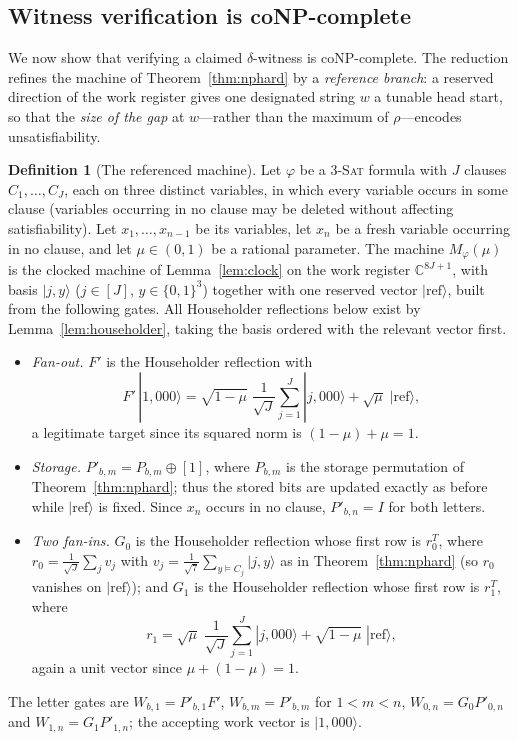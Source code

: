 \documentclass[11pt]{amsart}
\theoremstyle{definition}
\newtheorem{definition}[theorem]{Definition}
\theoremstyle{remark}
\newcommand{\C}{\mathbb{C}}
\begin{document}
\subsection*{Witness verification is coNP-complete}

We now show that verifying a claimed $\delta$-witness is
coNP-complete. The reduction refines the machine of
Theorem~\ref{thm:nphard} by a \emph{reference branch}: a reserved
direction of the work register gives one designated string $w$ a
tunable head start, so that the \emph{size of the gap} at
$w$---rather than the maximum of $\rho$---encodes unsatisfiability.

\begin{definition}[The referenced machine]\label{def:refmachine}
Let $\varphi$ be a \textup{\textsc{3-Sat}} formula with $J$ clauses
$C_1,\dots,C_J$, each on three distinct variables, in which every
variable occurs in some clause (variables occurring in no clause may
be deleted without affecting satisfiability). Let
$x_1,\dots,x_{n-1}$ be its variables, let $x_n$ be a fresh variable
occurring in no clause, and let $\mu\in(0,1)$ be a rational
parameter. The machine $M_\varphi(\mu)$ is the clocked machine of
Lemma~\ref{lem:clock} on the work register $\C^{8J+1}$, with basis
$|j,y\rangle$ ($j\in[J]$, $y\in\{0,1\}^3$) together with one
reserved vector $|\mathrm{ref}\rangle$, built from the following
gates. All Householder reflections below exist by
Lemma~\ref{lem:householder}, taking the basis ordered with the
relevant vector first.
\begin{itemize}
\item \emph{Fan-out.} $F'$ is the Householder reflection with
\[
  F'\,|1,000\rangle
  =\sqrt{1-\mu}\;\frac1{\sqrt J}\sum_{j=1}^J|j,000\rangle
  +\sqrt{\mu}\;|\mathrm{ref}\rangle ,
\]
a legitimate target since its squared norm is $(1-\mu)+\mu=1$.
\item \emph{Storage.} $P'_{b,m}=P_{b,m}\oplus[1]$, where $P_{b,m}$
is the storage permutation of Theorem~\ref{thm:nphard}; thus the
stored bits are updated exactly as before while
$|\mathrm{ref}\rangle$ is fixed. Since $x_n$ occurs in no clause,
$P'_{b,n}=I$ for both letters.
\item \emph{Two fan-ins.} $G_0$ is the Householder reflection whose
first row is $r_0^{T}$, where
$r_0=\frac1{\sqrt J}\sum_{j}v_j$ with
$v_j=\frac1{\sqrt7}\sum_{y\models C_j}|j,y\rangle$ as in
Theorem~\ref{thm:nphard} (so $r_0$ vanishes on
$|\mathrm{ref}\rangle$); and $G_1$ is the Householder reflection
whose first row is $r_1^{T}$, where
\[
  r_1=\sqrt{\mu}\;\frac1{\sqrt J}\sum_{j=1}^J|j,000\rangle
  +\sqrt{1-\mu}\;|\mathrm{ref}\rangle ,
\]
again a unit vector since $\mu+(1-\mu)=1$.
\end{itemize}
The letter gates are $W_{b,1}=P'_{b,1}F'$, $W_{b,m}=P'_{b,m}$ for
$1<m<n$, $W_{0,n}=G_0P'_{0,n}$ and $W_{1,n}=G_1P'_{1,n}$; the
accepting work vector is $|1,000\rangle$.
\end{definition}
\end{document}
